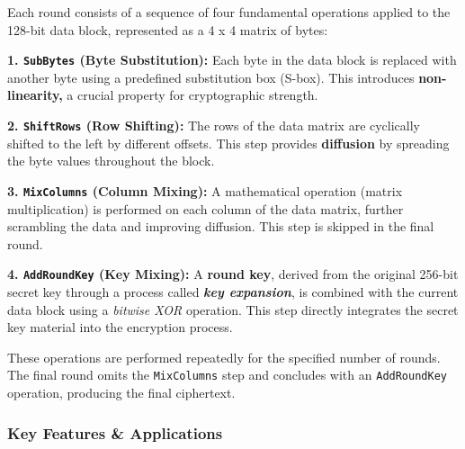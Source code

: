 Each round consists of a sequence of four fundamental operations applied to the 128-bit data block, represented as a 4 x 4 matrix of bytes:

\textbf{1. \texttt{SubBytes} (Byte Substitution): }Each byte in the data block is replaced with another byte using a predefined substitution box (S-box). This introduces \textbf{ non-linearity, } a crucial property for cryptographic strength.

\textbf{2. \texttt{ShiftRows} (Row Shifting): }The rows of the data matrix are cyclically shifted to the left by different offsets. This step provides \textbf{diffusion} by spreading the byte values throughout the block.

\textbf{3. \texttt{MixColumns} (Column Mixing): }A mathematical operation (matrix multiplication) is performed on each column of the data matrix, further scrambling the data and improving diffusion. This step is skipped in the final round.

\textbf{4. \texttt{AddRoundKey} (Key Mixing): }A \textbf{round key}, derived from the original 256-bit secret key through a process called \textit{\textbf{key expansion}}, is combined with the current data block using a \textit{bitwise XOR} operation. This step directly integrates the secret key material into the encryption process.

These operations are performed repeatedly for the specified number of rounds. The final round omits the \texttt{MixColumns} step and concludes with an \texttt{AddRoundKey} operation, producing the final ciphertext.

\subsubsection{\textbf{Key Features \& Applications}}

